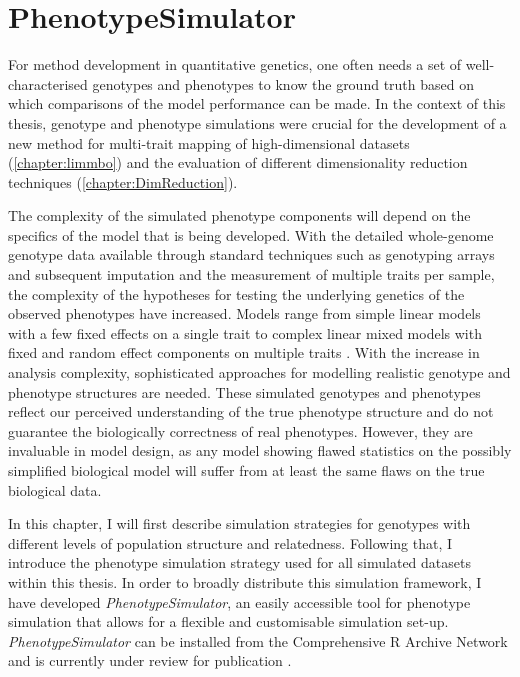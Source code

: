 \chapter{PhenotypeSimulator}
\label{chapter:simulation} 
For method development in quantitative genetics, one often needs a set of well-characterised genotypes and phenotypes to know the ground truth based on which comparisons of the model performance can be made. In the context of this thesis, genotype and phenotype simulations were crucial for the development of a new method for multi-trait mapping of high-dimensional datasets (\cref{chapter:limmbo}) and the evaluation of different dimensionality reduction techniques (\cref{chapter:DimReduction}).

The complexity of the simulated phenotype components will depend on the specifics of the model that is being developed. With the detailed whole-genome genotype data available through standard techniques such as genotyping arrays and subsequent imputation and the measurement of multiple traits per sample, the complexity of the hypotheses for testing the underlying genetics of the observed phenotypes have increased. Models range from simple linear models with a few fixed effects on a single trait to complex linear mixed models with fixed and random effect components on multiple traits \citep{Stephens2013,Marigorta2014,Zhou2014,Loh2014}. With the increase in analysis complexity, sophisticated approaches for modelling realistic genotype and phenotype structures are needed. These simulated genotypes and phenotypes reflect our perceived understanding of the true phenotype structure and do not guarantee the biologically correctness of real phenotypes. However, they are invaluable in model design, as any model showing flawed statistics on the possibly simplified biological model will suffer from at least the same flaws on the true biological data.

In this chapter, I will first describe simulation strategies for genotypes with different levels of population structure and relatedness. Following that, I introduce the phenotype simulation strategy used for all simulated datasets within this thesis. In order to broadly distribute this simulation framework, I have developed \textit{PhenotypeSimulator}, an easily accessible tool for phenotype simulation that allows for a flexible and customisable simulation set-up. \textit{PhenotypeSimulator} can be installed from the Comprehensive R Archive Network \citep{Meyer2017b} and is currently under review for publication \citep{Meyer2017a}.

